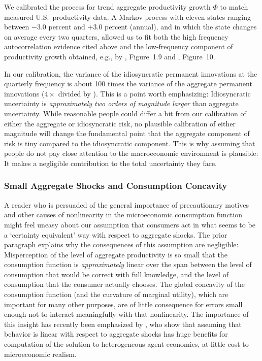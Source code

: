 We calibrated the process for trend aggregate productivity growth $\Phi$ to match measured U.S.\ productivity data.  A Markov process with eleven states ranging between $-3.0$ percent and $+3.0$ percent (annual), and in which the state changes on average every two quarters, allowed us to fit both the high frequency autocorrelation evidence cited above and the low-frequency component of productivity growth obtained, e.g., by \cite{sswNAIRU}, Figure~1.9 and \cite{fernald:disappointingRecovery}, Figure~10.

In our calibration, the variance of the idiosyncratic permanent innovations at the quarterly frequency is about 100 times the variance of the aggregate permanent innovations ($4 \times $ divided by $ $).  This is a point worth emphasizing: Idiosyncratic uncertainty is {\it approximately two orders of magnitude larger} than aggregate uncertainty.  While reasonable people could differ a bit from our calibration of either the aggregate or idiosyncratic risk, no plausible calibration of either magnitude will change the fundamental point that the aggregate component of risk is tiny compared to the idiosyncratic component.  This is why assuming that people do not pay close attention to the macroeconomic environment is plausible: It makes a negligible contribution to the total uncertainty they face.

\hypertarget{ConcavityAggImp}{}
\subsubsection{Small Aggregate Shocks and Consumption Concavity}
A reader who is persuaded of the general importance of precautionary motives and other causes of nonlinearity in the microeconomic consumption function might feel uneasy about our assumption that consumers act in what seems to be a `certainty equivalent' way with respect to aggregate shocks.  The prior paragraph explains why the consequences of this assumption are negligible: Misperception of the level of aggregate productivity is so small that the consumption function is \textit{approximately} linear over the span between the level of consumption that would be correct with full knowledge, and the level of consumption that the consumer actually chooses.  The global concavity of the consumption function (and the curvature of marginal utility), which are important for many other purposes, are of little consequence for errors small enough not to interact meaningfully with that nonlinearity.  The importance of this insight has recently been emphasized by \cite{bmpMITshocks}, who show that assuming that behavior is linear with respect to aggregate shocks has huge benefits for computation of the solution to heterogeneous agent economies, at little cost to microeconomic realism.


